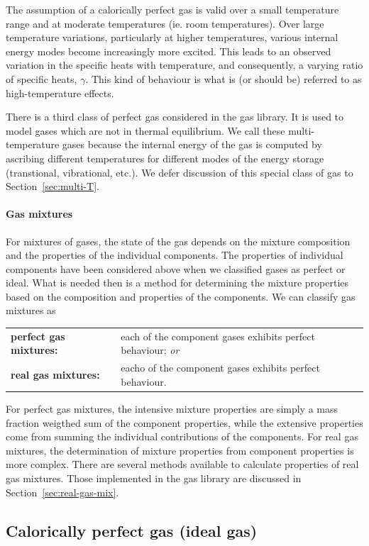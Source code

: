 The assumption of a calorically perfect gas is valid over a small temperature range and at moderate
temperatures (ie. room temperatures).
Over large temperature variations, particularly at higher temperatures, various internal energy modes
become increasingly more excited.
This leads to an observed variation in the specific heats with temperature, and consequently, 
a varying ratio of specific heats, $\gamma$.
This kind of behaviour is what is (or should be) referred to as high-temperature effects.

There is a third class of perfect gas considered in the gas library.
It is used to model gases which are not in thermal equilibrium.
We call these multi-temperature gases because the internal energy of the gas
is computed by ascribing different temperatures for different modes of the energy storage
(transtional, vibrational, etc.).
We defer discussion of this special class of gas to Section~\ref{sec:multi-T}.

\paragraph{Gas mixtures}
For mixtures of gases, the state of the gas depends on the mixture
composition and the properties of the individual components.
The properties of individual components have been considered
above when we classified gases as perfect or ideal.
What is needed then is a method for determining the mixture
properties based on the composition and properties of the components.
We can classify gas mixtures as\\
\begin{tabular}{lp{12cm}}
\textbf{perfect gas mixtures:} & each of the component gases exhibits perfect behaviour; \emph{or} \\
\textbf{real gas mixtures:} & eacho of the component gases exhibits perfect behaviour.
\end{tabular}

For perfect gas mixtures, the intensive mixture properties are simply a mass fraction weigthed sum
of the component properties, while the extensive properties come from summing the individual contributions
of the components.
For real gas mixtures, the determination of mixture properties from component properties is more complex.
There are several methods available to calculate properties of real gas mixtures.
Those implemented in the gas library are discussed in Section~\ref{sec:real-gas-mix}.


\subsection{Calorically perfect gas (ideal gas)}
\label{sec:cal-perf}

